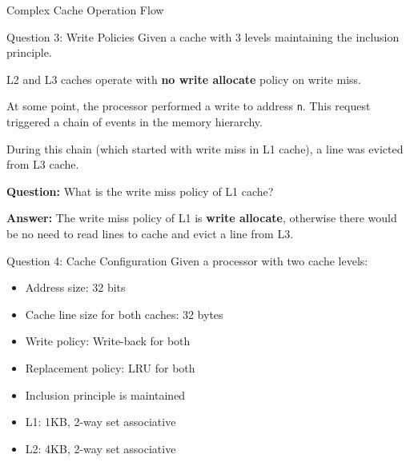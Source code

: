 \documentclass[aspectratio=169,12pt]{beamer}
\begin{document}
\begin{frame}{Complex Cache Operation Flow}
\begin{center}
\end{center}
\end{frame}

\begin{frame}{Question 3: Write Policies}
Given a cache with 3 levels maintaining the inclusion principle.

L2 and L3 caches operate with \textbf{no write allocate} policy on write miss.

At some point, the processor performed a write to address \texttt{n}. This request triggered a chain of events in the memory hierarchy.

During this chain (which started with write miss in L1 cache), a line was evicted from L3 cache.

\textbf{Question:} What is the write miss policy of L1 cache?

\textbf{Answer:} The write miss policy of L1 is \textbf{write allocate}, otherwise there would be no need to read lines to cache and evict a line from L3.
\end{frame}

\begin{frame}{Question 4: Cache Configuration}
Given a processor with two cache levels:
\begin{itemize}
    \item Address size: 32 bits
    \item Cache line size for both caches: 32 bytes
    \item Write policy: Write-back for both
    \item Replacement policy: LRU for both
    \item Inclusion principle is maintained
    \item L1: 1KB, 2-way set associative
    \item L2: 4KB, 2-way set associative
\end{itemize}
\end{frame}
\end{document}
